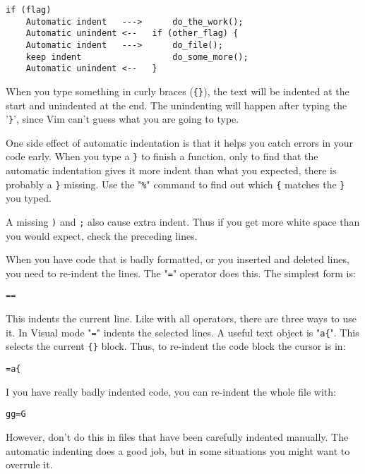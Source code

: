 \begin{Verbatim}[samepage=true]
                             if (flag)
    Automatic indent   --->      do_the_work();
    Automatic unindent <--   if (other_flag) {
    Automatic indent   --->      do_file();
    keep indent                  do_some_more();
    Automatic unindent <--   }
\end{Verbatim}

When you type something in curly braces (\texttt{\{\}}), the text will be indented at the start and unindented at the end.
The unindenting will happen after typing the '\texttt{\}}', since Vim can't guess what you are going to type.

One side effect of automatic indentation is that it helps you catch errors in your code early.
When you type a \texttt{\}} to finish a function, only to find that the automatic indentation gives it more indent than what you expected, there is probably a \texttt{\}} missing.
Use the "\texttt{\%}" command to find out which \texttt{\{} matches the \texttt{\}} you typed.

A missing \texttt{)} and \texttt{;} also cause extra indent.
Thus if you get more white space than you would expect, check the preceding lines.

When you have code that is badly formatted, or you inserted and deleted lines, you need to re-indent the lines.
The "\texttt{=}" operator does this.
The simplest form is:

\begin{Verbatim}[samepage=true]
 ==
\end{Verbatim}

This indents the current line.
Like with all operators, there are three ways to use it.
In Visual mode "\texttt{=}" indents the selected lines.
A useful text object is "\texttt{a\{}".
This selects the current \texttt{\{\}} block.
Thus, to re-indent the code block the cursor is in:

\begin{Verbatim}[samepage=true]
 =a{
\end{Verbatim}

I you have really badly indented code, you can re-indent the whole file with:

\begin{Verbatim}[samepage=true]
 gg=G
\end{Verbatim}

However, don't do this in files that have been carefully indented manually.
The automatic indenting does a good job, but in some situations you might want to overrule it.
